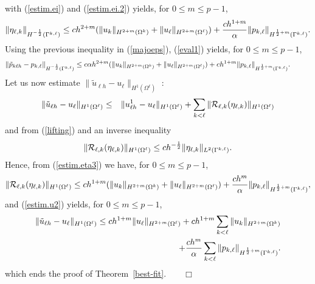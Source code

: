 \documentclass[final]{siamltex}
\begin{document}
with (\ref{estim.ei}) and (\ref{estim.ei.2}) yields, for $0\le m \le p-1$,
\begin{eqnarray}
\|\eta_{\ell,k}\|_{H^{-{1 \over 2}}(\Gamma^{k,\ell})}
\le c h^{2+m}
(\|u_k\|_{H^{2+m}(\Omega^k)}+\|u_{\ell}\|_{H^{2+m}(\Omega^{\ell})})
+{ch^{1+m} \over \alpha}
\| p_{k,\ell} \|_{H^{{1 \over 2}+m}(\Gamma^{k,\ell})}. \nonumber
\end{eqnarray}
Using the previous inequality in (\ref{majoeps}), (\ref{eval1}) yields, for $0\le m \le p-1$,
\begin{eqnarray}\label{estim.p}
\| \tilde{p}_{k \ell h} - p_{k,\ell} \|_{H^{-{1 \over 2}}(\Gamma^{k,\ell})}
\le c\alpha h^{2+m}
(\|u_k\|_{H^{2+m}(\Omega^k)}+\|u_{\ell}\|_{H^{2+m}(\Omega^{\ell})})
+c h^{1+m} \| p_{k,\ell} \|_{H^{{1 \over 2}+m}(\Gamma^{k,\ell})}.\hspace{10mm}
\end{eqnarray}
Let us now estimate $\| \tilde{u}_{\ell h} - u_{\ell}\|_{H^1(\Omega^{\ell})}$ :
\begin{eqnarray}\label{estim.u2}
\| \tilde{u}_{\ell h} - u_{\ell}\|_{H^1(\Omega^{\ell})}
&\le& \| u_{\ell h}^1 - u_{\ell}\|_{H^1(\Omega^{\ell})}
+ \sum_{k < \ell} \| {\cal R}_{\ell,k}(\eta_{\ell,k}) \|_{H^1(\Omega^{\ell})}
\end{eqnarray}
and from (\ref{lifting}) and an inverse inequality
\begin{eqnarray}
\| {\cal R}_{\ell,k}(\eta_{\ell,k}) \|_{H^1(\Omega^{\ell})}
\le c h^{- {1 \over 2}} \|\eta_{\ell,k} \|_{L^2(\Gamma^{k,\ell})}. \nonumber
\end{eqnarray}
Hence, from (\ref{estim.eta3}) we have, for $0\le m \le p-1$,
\begin{eqnarray}\label{estim.R}
\| {\cal R}_{\ell,k}(\eta_{\ell,k}) \|_{H^1(\Omega^{\ell})}
\le
ch^{1+m}(\|u_k\|_{H^{2+m}(\Omega^k)}+\|u_{\ell}\|_{H^{2+m}(\Omega^{\ell})})
+{c h^m\over \alpha}  \| p_{k,\ell} \|_{H^{{1 \over 2}+m}(\Gamma^{k,\ell})},
\nonumber
\end{eqnarray}
and (\ref{estim.u2}) yields, for $0\le m \le p-1$,
\begin{eqnarray}\label{estim.u3}
\| \tilde{u}_{\ell h} - u_{\ell}\|_{H^1(\Omega^{\ell})}
\le ch^{1+m} \|u_{\ell}\|_{H^{2+m}(\Omega^{\ell})}
+ ch^{1+m}\sum_{k < \ell} \|u_k\|_{H^{2+m}(\Omega^k)}
\nonumber\\
+{c h^m \over \alpha} \sum_{k < \ell} \| p_{k,\ell} \|_{H^{{1 \over
2}+m}(\Gamma^{k,\ell})}.
\end{eqnarray}
which ends the proof of Theorem~\ref{best-fit}.$\qquad \Box$
\end{document}

